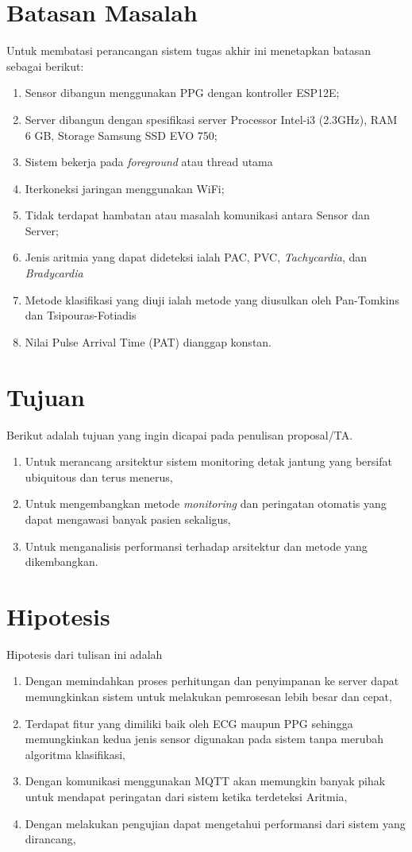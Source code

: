 \section{Batasan Masalah}
Untuk membatasi perancangan sistem tugas akhir ini menetapkan batasan sebagai berikut:
\begin{enumerate}
	\item Sensor dibangun menggunakan PPG dengan kontroller ESP12E;
    \item Server dibangun dengan spesifikasi server Processor Intel-i3 (2.3GHz), RAM 6 GB, Storage Samsung SSD EVO 750;
	\item Sistem bekerja pada \textit{foreground} atau thread utama
    \item Iterkoneksi jaringan menggunakan WiFi;
    \item Tidak terdapat hambatan atau masalah komunikasi antara Sensor dan Server;
    \item Jenis aritmia yang dapat dideteksi ialah PAC, PVC, \textit{Tachycardia}, dan \textit{Bradycardia}
    \item Metode klasifikasi yang diuji ialah metode yang diusulkan oleh Pan-Tomkins dan Tsipouras-Fotiadis
    \item Nilai Pulse Arrival Time (PAT) dianggap konstan.
\end{enumerate}
\section{Tujuan}
Berikut adalah tujuan yang ingin dicapai pada penulisan proposal/TA.
\begin{enumerate}
    \item Untuk merancang arsitektur sistem monitoring detak jantung yang bersifat ubiquitous dan terus menerus,
    \item Untuk mengembangkan metode \textit{monitoring} dan peringatan otomatis yang dapat mengawasi banyak pasien sekaligus,
    \item Untuk menganalisis performansi terhadap arsitektur dan metode yang dikembangkan.
\end{enumerate}
\section{Hipotesis}
Hipotesis dari tulisan ini adalah
\begin{enumerate}
    \item Dengan memindahkan proses perhitungan dan penyimpanan ke server dapat memungkinkan sistem untuk melakukan pemrosesan lebih besar dan cepat,
    \item Terdapat fitur yang dimiliki baik oleh ECG maupun PPG sehingga memungkinkan kedua jenis sensor digunakan pada sistem tanpa merubah algoritma klasifikasi,
    \item Dengan komunikasi menggunakan MQTT akan memungkin banyak pihak untuk mendapat peringatan dari sistem ketika terdeteksi Aritmia,
	\item Dengan melakukan pengujian dapat mengetahui performansi dari sistem yang dirancang,
\end{enumerate}

